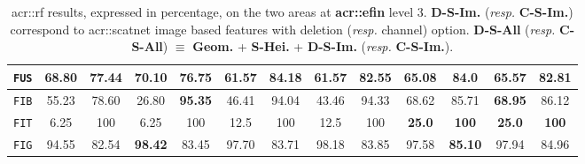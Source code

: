 \begin{table}[htpb]
\begin{center}
\begin{tabular}{| c | c c | c c | c c | c c | c c | c c |}
                        \texttt{FUS} & 68.80 & 77.44 & \textbf{70.10} & 76.75 & 61.57 & \textbf{84.18} & 61.57 & 82.55 & 65.08 & 84.0 & 65.57 & 82.81 \\
                        \hline
                        \texttt{FIB} & 55.23 & 78.60 & 26.80 & \textbf{95.35} & 46.41 & 94.04 & 43.46 & 94.33 & 68.62 & 85.71 & \textbf{68.95} & 86.12 \\
                        \hline
                        \texttt{FIT} & 6.25 & 100 & 6.25 & 100 & 12.5 & 100 & 12.5 & 100 & \textbf{25.0} & \textbf{100} & \textbf{25.0} & \textbf{100} \\
                        \hline
                        \texttt{FIG} & 94.55 & 82.54 & \textbf{98.42} & 83.45 & 97.70 & 83.71 & 98.18 & 83.85 & 97.58 & \textbf{85.10} & 97.94 & 84.96 \\
                        \hline
                    \end{tabular}
                \end{center}
                \caption{
                    \label{tab::stats_scat_rf_f3}
                    \gls{acr::rf} results, expressed in percentage, on the two areas at \textbf{\gls{acr::efin}} level 3.
                    \textbf{D-S-Im.} (\textit{resp.} \textbf{C-S-Im.}) correspond to \gls{acr::scatnet} image based features with deletion (\textit{resp.} channel) option.
                    \textbf{D-S-All} (\textit{resp.} \textbf{C-S-All}) \(\equiv\) \textbf{Geom.} + \textbf{S-Hei.} + \textbf{D-S-Im.} (\textit{resp.} \textbf{C-S-Im.}).
                }
            \end{table}
